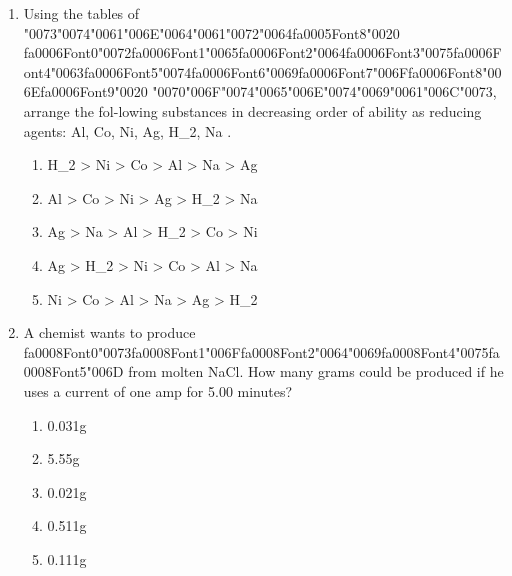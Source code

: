 \documentclass[12pt]{article}
\begin{document}
\begin{enumerate}[label=\arabic*.]
\begin{enumerate}[label=(\alph*)]
    \item 250 liters
    \item 450 liters
    \item 100 liters
    \item 350 liters
    \item 150 liters
\end{enumerate}
\item Using the tables of {\char"0073}{\char"0074}{\char"0061}{\char"006E}{\char"0064}{\char"0061}{\char"0072}{\char"0064}{\csname fa0005Font8\endcsname\char"0020} {\csname fa0006Font0\endcsname\char"0072}{\csname fa0006Font1\endcsname\char"0065}{\csname fa0006Font2\endcsname\char"0064}{\csname fa0006Font3\endcsname\char"0075}{\csname fa0006Font4\endcsname\char"0063}{\csname fa0006Font5\endcsname\char"0074}{\csname fa0006Font6\endcsname\char"0069}{\csname fa0006Font7\endcsname\char"006F}{\csname fa0006Font8\endcsname\char"006E}{\csname fa0006Font9\endcsname\char"0020} {\char"0070}{\char"006F}{\char"0074}{\char"0065}{\char"006E}{\char"0074}{\char"0069}{\char"0061}{\char"006C}{\char"0073}, arrange the fol-lowing substances in
decreasing order of ability as reducing agents: Al, Co, Ni, Ag, H\_2, Na .
\begin{enumerate}[label=(\alph*)]
    \item H\_2 \textgreater{} Ni \textgreater{} Co \textgreater{} Al \textgreater{} Na \textgreater{} Ag
    \item Al \textgreater{} Co \textgreater{} Ni \textgreater{} Ag \textgreater{} H\_2 \textgreater{} Na
    \item Ag \textgreater{} Na \textgreater{} Al \textgreater{} H\_2 \textgreater{} Co \textgreater{} Ni
    \item Ag \textgreater{} H\_2 \textgreater{} Ni \textgreater{} Co \textgreater{} Al \textgreater{} Na
    \item Ni \textgreater{} Co \textgreater{} Al \textgreater{} Na \textgreater{} Ag \textgreater{} H\_2
\end{enumerate}
\item A chemist wants to produce {\csname fa0008Font0\endcsname\char"0073}{\csname fa0008Font1\endcsname\char"006F}{\csname fa0008Font2\endcsname\char"0064}{\char"0069}{\csname fa0008Font4\endcsname\char"0075}{\csname fa0008Font5\endcsname\char"006D} from molten NaCl. How many grams could be produced if
he uses a current of one amp for 5.00 minutes?
\begin{enumerate}[label=(\alph*)]
    \item 0.031g
    \item 5.55g
    \item 0.021g
    \item 0.511g
    \item 0.111g
\end{enumerate}
\end{enumerate}
\end{document}
